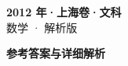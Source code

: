 \documentclass[zihao=-4, a4paper]{ctexart}
\begin{document}
\begin{center}
  {\Large\bfseries 2012 年·上海卷·文科}\\[4pt]
  {\large 数学 · 解析版}
\end{center}
\medskip
{}

\clearpage
{}
\begin{center}{\Large\bfseries 参考答案与详细解析}\end{center}
\medskip

\end{document}
